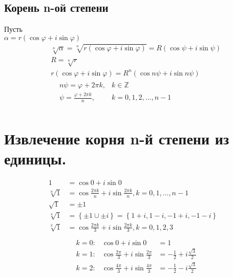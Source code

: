 \documentclass[12pt, fleqn]{article}
\begin{document}
\subsection*{Корень n-ой степени}
Пусть\\
$\alpha=r\left(\cos\varphi+i\sin\varphi\right)$
\begin{align*}
	&\sqrt[n]{\alpha}=\sqrt[n]{r\left(\cos\varphi+i\sin\varphi\right)}=R(\cos\psi+i\sin\psi)\\
	&R=\sqrt[n]{r}\\
	&r\left(\cos\varphi+i\sin\varphi\right)=R^n(\cos{n\psi}+i\sin{n\psi})\\
	&\begin{aligned}
		&n\psi=\varphi+2\pi k, &k\in \mathbb{Z}\\
		&\psi=\frac{\varphi+2\pi k}{n}, &k=0,1,2,\dots ,n-1\\
	\end{aligned}
\end{align*}
\section{Извлечение корня n-й степени из единицы.}
\begin{align*}
	1&=\cos0+i\sin0\\
	\sqrt[n]{1} &= \cos{\frac{2\pi k}{n}} + i \sin{\frac{2\pi k}{n}}, k=0,1,\dots ,n-1\\
	\sqrt{1} &= \pm1\\
	\sqrt[4]{1}&=\left\{\pm1\cup\pm i\right\}=\left\{1+i, 1-i, -1+i,-1-i\right\}\\
	\sqrt[3]{1}&=\cos{\frac{2\pi k}{3}} + i \sin{\frac{2\pi k}{3}}, k=0,1,2,3\\\\
	&\begin{aligned}
		&k=0\colon&\cos0 + i \sin0 & = 1\\
		&k=1\colon&\cos{\frac{2\pi}{3}} + i \sin{\frac{2\pi}{3}} & =-\frac{1}{2}+i\frac{\sqrt{3}}{2}\\
		&k=2\colon&\cos{\frac{4\pi}{3}} + i \sin{\frac{4\pi}{3}} & =-\frac{1}{2}-i\frac{\sqrt{3}}{2}\\
	\end{aligned}
\end{align*}
\end{document}
